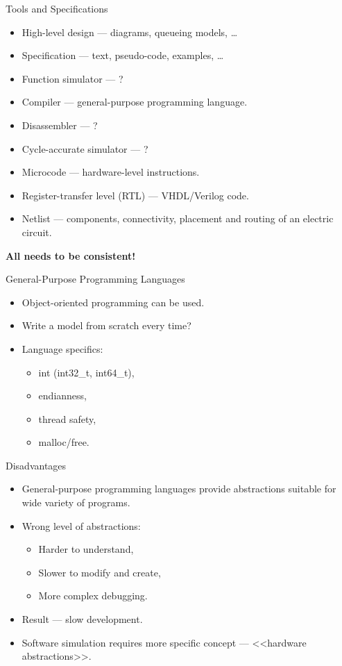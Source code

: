 \begin{frame}{Tools and Specifications}
  \begin{itemize}
    \item High-level design --- diagrams, queueing models, \dots
    \item Specification --- text, pseudo-code, examples, \dots
    \item Function simulator --- ?
    \item Compiler --- general-purpose programming language.
    \item Disassembler --- ?
    \item Cycle-accurate simulator --- ?
    \item Microcode --- hardware-level instructions.
    \item Register-transfer level (RTL) --- VHDL/Verilog code.
    \item Netlist --- components, connectivity, placement and routing of an
      electric circuit.
  \end{itemize}
  \pause
  \vfill
  \centering
  \textbf{All needs to be consistent!}
\end{frame}

\begin{frame}{General-Purpose Programming Languages}
  \begin{itemize}
    \item Object-oriented programming can be used.
    \item Write a model from scratch every time?
    \item Language specifics:
    \begin{itemize}
      \item int (int32\_t, int64\_t),
      \item endianness,
      \item thread safety,
      \item malloc/free.
    \end{itemize}
  \end{itemize}
\end{frame}

\begin{frame}{Disadvantages}
  \begin{itemize}
    \item General-purpose programming languages provide abstractions suitable
      for wide variety of programs. \pause
    \item Wrong level of abstractions:
    \begin{itemize}
      \item Harder to understand,
      \item Slower to modify and create,
      \item More complex debugging.
    \end{itemize} \pause
    \item Result --- slow development. \pause
    \item Software simulation requires more specific concept --- <<hardware
      abstractions>>.
  \end{itemize}
\end{frame}

